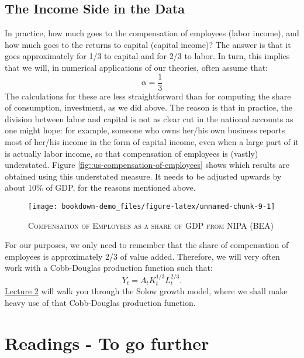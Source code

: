 \documentclass[]{book}
\theoremstyle{definition}
\theoremstyle{definition}
\theoremstyle{definition}
\theoremstyle{remark}
\begin{document}
\subsection{The Income Side in the
Data}\label{the-income-side-in-the-data}

In practice, how much goes to the compensation of employees (labor
income), and how much goes to the returns to capital (capital income)?
The answer is that it goes approximately for 1/3 to capital and for 2/3
to labor. In turn, this implies that we will, in numerical applications
of our theories, often assume that: \[\alpha = \frac{1}{3}\] The
calculations for these are less straightforward than for computing the
share of consumption, investment, as we did above. The reason is that in
practice, the division between labor and capital is not as clear cut in
the national accounts as one might hope: for example, someone who owns
her/his own business reports most of her/his income in the form of
capital income, even when a large part of it is actually labor income,
so that compensation of employees is (vastly) understated. Figure
\ref{fig::us-compensation-of-employees} shows which results are obtained
using this understated measure. It needs to be adjusted upwards by about
10\% of GDP, for the reasons mentioned above.

\begin{figure}

{\centering \texttt{[image: bookdown-demo\_files/figure-latex/unnamed-chunk-9-1]} 

}

\caption{\label{fig::us-compensation-of-employees}\textsc{Compensation of Employees as a share of GDP from NIPA (BEA)}}\label{fig:unnamed-chunk-9}
\end{figure}

For our purposes, we only need to remember that the share of
compensation of employees is approximately 2/3 of value added.
Therefore, we will very often work with a Cobb-Douglas production
function such that: \[Y_t = A_t K_t^{1/3} L_t^{2/3}.\]
\href{lecture2.html}{Lecture 2} will walk you through the Solow growth
model, where we shall make heavy use of that Cobb-Douglas production
function.

\section*{Readings - To go further}\label{readings---to-go-further}
\end{document}
